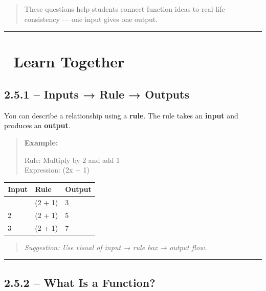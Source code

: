 \documentclass[
  letterpaper,
  DIV=11,
  numbers=noendperiod]{scrreprt}
\begin{document}
\begin{quote}
These questions help students connect function ideas to real-life
consistency --- one input gives one output.
\end{quote}

\begin{center}\rule{0.5\linewidth}{0.5pt}\end{center}

\section*{🧠 Learn Together}\label{learn-together-11}


\subsection*{2.5.1 -- Inputs → Rule →
Outputs}\label{inputs-rule-outputs}

You can describe a relationship using a \textbf{rule}. The rule takes an
\textbf{input} and produces an \textbf{output}.

\begin{quote}
\textbf{Example:}

Rule: Multiply by 2 and add 1\\
Expression: (2x + 1)
\end{quote}

\begin{longtable}[]{@{}lll@{}}
\toprule\noalign{}
Input & Rule & Output \\
\midrule\noalign{}
\endhead
\bottomrule\noalign{}
\endlastfoot
1 & (2 \cdot 1 + 1) & 3 \\
2 & (2 \cdot 2 + 1) & 5 \\
3 & (2 \cdot 3 + 1) & 7 \\
\end{longtable}

\begin{quote}
\emph{Suggestion: Use visual of input → rule box → output flow.}
\end{quote}

\begin{center}\rule{0.5\linewidth}{0.5pt}\end{center}

\subsection*{2.5.2 -- What Is a Function?}\label{what-is-a-function}
\end{document}
